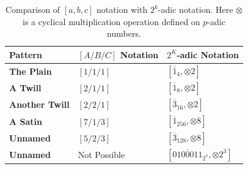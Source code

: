\documentclass[times,twocolumn,final]{elsarticle}
\begin{document}
\begin{table}[htbp!]
\begin{center}
\begin{tabular}{ | m{} | m{}| m{} | } 
  \hline
\textbf{Pattern} &
\textbf{$[A/B/C]$ Notation}&
\textbf{$2^K$-adic Notation} \\ 
  \hline
\textbf{The Plain} &
$[1/1/1]$&
    $[\overline{1}_{4}, \otimes 2]$ \\ 
  \hline
\textbf{A Twill} &
$[2/1/1]$&
$[\overline{1}_{8}, \otimes 2]$ \\ 
  \hline
\textbf{Another Twill} &
$[2/2/1]$&
$[\overline{3}_{16}, \otimes 2]$ \\ 
  \hline
  \textbf{A Satin} &
$[7/1/3]$&
$[\overline{1}_{256}, \otimes 8]$  \\ 
  \hline
  \textbf{Unnamed} &
$[5/2/3]$&
$[\overline{3}_{128}, \otimes 8]$  \\ 
  \hline
  \textbf{Unnamed} &
Not Possible&
$[\overline{0100011}_{2^7}, \otimes 2^3]$  \\ 
  \hline
\end{tabular}
\end{center}
\caption{Comparison of $[a,b,c]$ notation with $2^k$-adic notation. Here $\otimes$ is a cyclical multiplication operation defined on $p$-adic numbers.}
\label{table_comparison}
\end{table}
\end{document}
